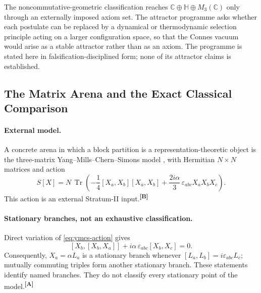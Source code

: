 \documentclass[12pt,a4paper,twoside]{article}
\theoremstyle{plain}
\theoremstyle{definition}
\theoremstyle{remark}
\newcommand{\catmark}[1]{\textsuperscript{\textsf{\textbf{[#1]}}}}
\begin{document}
The noncommutative-geometric classification reaches
$\mathbb{C}\oplus\mathbb{H}\oplus M_3(\mathbb{C})$ only through an
externally imposed axiom set. The attractor programme asks whether each
postulate can be replaced by a dynamical or thermodynamic selection
principle acting on a larger configuration space, so that the Connes
vacuum would arise as a stable attractor rather than as an axiom. The
programme is stated here in falsification-disciplined form; none of its
attractor claims is established.

\subsection{The Matrix Arena and the Exact Classical Comparison}
\label{subsec:matrix-arena}

\paragraph{External model.}
A concrete arena in which a block partition is a representation-theoretic
object is the three-matrix Yang--Mills--Chern--Simons model
\cite{azuma2004}, with Hermitian $N\times N$ matrices and action
\begin{equation}
\label{eq:ymcs-action}
S[X]=N\,\operatorname{Tr}\!\left(
-\frac14[X_a,X_b][X_a,X_b]
+\frac{2i\alpha}{3}\,\varepsilon_{abc}X_aX_bX_c
\right).
\end{equation}
This action is an external Stratum-II input.\catmark{B}

\paragraph{Stationary branches, not an exhaustive classification.}
Direct variation of \cref{eq:ymcs-action} gives
\begin{equation}
\label{eq:ymcs-eom}
[X_b,[X_b,X_a]]+i\alpha\,\varepsilon_{abc}[X_b,X_c]=0.
\end{equation}
Consequently, $X_a=\alpha L_a$ is a stationary branch whenever
$[L_a,L_b]=i\varepsilon_{abc}L_c$; mutually commuting triples form
another stationary branch. These statements identify named branches.
They do not classify every stationary point of the model.\catmark{A}
\end{document}
